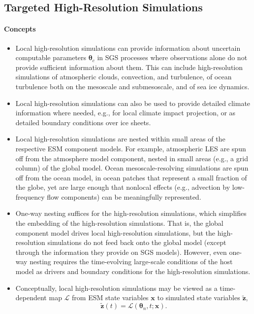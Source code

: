 \documentclass{article}
\renewcommand{\vec}[1]{\boldsymbol{{#1}}}
\begin{document}
\subsection{Targeted High-Resolution Simulations}

\paragraph{Concepts}
\begin{itemize}
    \item Local high-resolution simulations can provide information about uncertain computable parameters $\vec{\theta}_c$ in SGS processes where observations alone do not provide sufficient information about them. This can include high-resolution simulations of atmospheric clouds, convection, and turbulence, of ocean turbulence both on the mesoscale and submesoscale, and of sea ice dynamics. 
    \item Local high-resolution simulations can also be used to provide detailed climate information where needed, e.g., for local climate impact projection, or as detailed boundary conditions over ice sheets.
    \item Local high-resolution simulations are nested within small areas of the respective ESM component models. For example, atmospheric LES are spun off from the atmosphere model component, nested in small areas (e.g., a grid column) of the global model. Ocean mesoscale-resolving simulations are spun off from the ocean model, in ocean patches that represent a small fraction of the globe, yet are large enough that nonlocal effects (e.g., advection by low-frequency flow components) can be meaningfully represented.
    \item One-way nesting suffices for the high-resolution simulations, which simplifies the embedding of the high-resolution simulations. That is, the global component model drives local high-resolution simulations, but the high-resolution simulations do not feed back onto the global model (except through the information they provide on SGS models). However, even one-way nesting requires the time-evolving large-scale conditions of the host model as drivers and boundary conditions for the high-resolution simulations. 
    \item Conceptually, local high-resolution simulations may be viewed as a time-depen\-dent map $\mathcal{L}$ from ESM state variables $\vec{x}$  to simulated state variables $\vec{\tilde z}$,
    \begin{equation}
    \vec{\tilde z}(t) = \mathcal{L}(\vec{\theta}_n,t; \vec{x}).

\end{equation}
\end{itemize}
\end{document}
